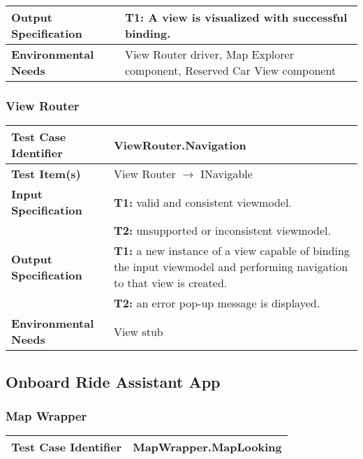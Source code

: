 {\begin{tabularx}{\textwidth}{l X}
    \textbf{Output Specification} & \textbf{T1:} A view is visualized with successful binding.\\
    \hline 
    
    \textbf{Environmental Needs} & View Router driver, Map Explorer component, Reserved Car View component\\
    \hline
\end{tabularx}

\subsubsection{View Router}
\noindent
\begin{tabularx}{\textwidth}{l X}
    \hline 
    \textbf{Test Case Identifier} & ViewRouter.Navigation\\ 
    \hline 
    
    \textbf{Test Item(s)} & View Router $\rightarrow$ INavigable\\
    \hline 
    
    \textbf{Input Specification} & \textbf{T1:} valid and consistent viewmodel.\\
                                & \textbf{T2:} unsupported or inconsistent viewmodel.\\
    \hline 
    
    \textbf{Output Specification} & \textbf{T1:} a new instance of a view capable of binding the input viewmodel and performing navigation to that view is created.\\
                                & \textbf{T2:} an error pop-up message is displayed.\\
    \hline 
    
    \textbf{Environmental Needs} & View stub\\
    \hline
\end{tabularx}


\subsection{Onboard Ride Assistant App}

\subsubsection{Map Wrapper}
\noindent
\begin{tabularx}{\textwidth}{l X}
    \hline 
    \textbf{Test Case Identifier} & MapWrapper.MapLooking\\ 
    \hline 
    

\end{tabularx}}
